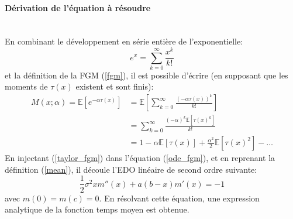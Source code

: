 \paragraph{Dérivation de l'équation à résoudre}\phantom{}\\
En combinant le développement en série entière de l'exponentielle: 
\[
e^x=\sum_{k=0}^\infty\frac{x^k}{k!}
\]
et la définition de la \acl{FGM} (\ref{fgm}), il est possible d'écrire (en supposant que les moments de $\tau(x)$ existent et sont finis): 
\begin{equation}\label{taylor_fgm}
    \begin{aligned}
        M(x;\alpha)=\mathds{E}\left[e^{-\alpha \tau(x)}\right]&=\mathds{E}\left[\sum_{k=0}^\infty\frac{{(-\alpha\tau(x))}^k}{k!}\right] \\
        &= \sum_{k=0}^\infty\frac{{(-\alpha)}^k\mathds{E}\left[{\tau(x)}^k\right]}{k!}\\
        &=1-\alpha\mathds{E}[\tau(x)]+\frac{\alpha^2}{2}\mathds{E}\left[{\tau(x)}^2\right]-\ldots
    \end{aligned}
\end{equation}
En injectant (\ref{taylor_fgm}) dans l'équation (\ref{ode_fgm}), et en reprenant la définition (\ref{mean}), il découle l'\acs{EDO} linéaire de second ordre suivante: 
\begin{equation}\label{ode_mean}
    \frac{1}{2}\sigma^2xm''(x)+a(b-x)m'(x)=-1   
\end{equation}
avec $m(0)=m(c)=0$. En résolvant cette équation, une expression analytique de la fonction temps moyen est obtenue. 

